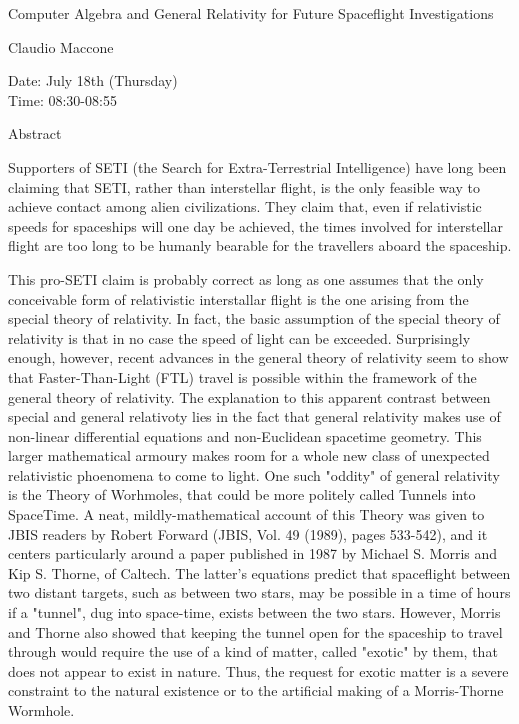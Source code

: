 \begin{center}
\LARGE
Computer Algebra and General Relativity for Future
                   Spaceflight Investigations
\end{center}

\begin{center}
\Large
Claudio Maccone

\end{center}

\noindent
Date:  July 18th (Thursday)\\
Time:  08:30-08:55\\

\begin{center}
\large
Abstract
\end{center}

Supporters of SETI (the Search for Extra-Terrestrial Intelligence) have long been claiming that
SETI, rather than interstellar flight, is the only feasible way to achieve contact among alien
civilizations. They claim that, even if relativistic speeds for spaceships will one day be achieved,
the times involved for interstellar flight are too long to be humanly bearable for the travellers
aboard the spaceship. 

This pro-SETI claim is probably correct as long as one assumes that the only conceivable form of
relativistic interstallar flight is the one arising from the special theory of relativity. In fact, the
basic assumption of the special theory of relativity is that in no case the speed of light can be
exceeded. Surprisingly enough, however, recent advances in the general theory of relativity seem
to show that Faster-Than-Light (FTL) travel is possible within the framework of the general
theory of relativity. The explanation to this apparent contrast between special and general
relativoty lies in the fact that general relativity makes use of non-linear differential equations and
non-Euclidean spacetime geometry. This larger mathematical armoury makes room for a whole
new class of unexpected relativistic phoenomena to come to light. One such "oddity" of general
relativity is the Theory of Worhmoles, that could be more politely called Tunnels into SpaceTime.
A neat, mildly-mathematical account of this Theory was given to JBIS readers by Robert Forward
(JBIS, Vol. 49 (1989), pages 533-542), and it centers particularly around a paper published in 1987
by Michael S. Morris and Kip S. Thorne, of Caltech. The latter's equations predict that spaceflight
between two distant targets, such as between two stars, may be possible in a time of hours if a
"tunnel", dug into space-time, exists between the two stars. However, Morris and Thorne also
showed that keeping the tunnel open for the spaceship to travel through would require the use of a
kind of matter, called "exotic" by them, that does not appear to exist in nature. Thus, the request
for exotic matter is a severe constraint to the natural existence or to the artificial making of a
Morris-Thorne Wormhole. 

